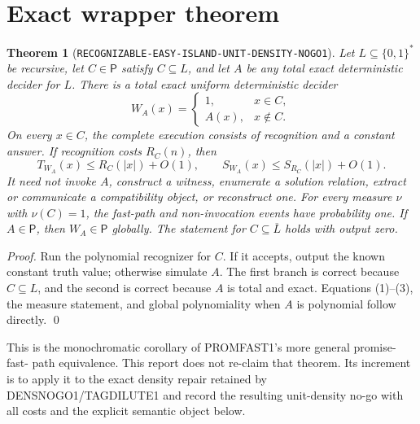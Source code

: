 \documentclass[11pt]{article}
\newtheorem{theorem}{Theorem}
\begin{document}
\section{Exact wrapper theorem}
\begin{theorem}[\texttt{RECOGNIZABLE-EASY-ISLAND-UNIT-DENSITY-NOGO1}]
Let \(L\subseteq\{0,1\}^*\) be recursive, let \(C\in\mathsf P\) satisfy
\(C\subseteq L\), and let \(A\) be any total exact deterministic decider for
\(L\). There is a total exact uniform deterministic decider
\[
 W_A(x)=\begin{cases}1,&x\in C,\\ A(x),&x\notin C.\end{cases} \tag{2}
\]
On every \(x\in C\), the complete execution consists of recognition and a
constant answer. If recognition costs \(R_C(n)\), then
\[
 T_{W_A}(x)\le R_C(|x|)+O(1),\qquad
 S_{W_A}(x)\le S_{R_C}(|x|)+O(1).                        \tag{3}
\]
It need not invoke \(A\), construct a witness, enumerate a solution relation,
extract or communicate a compatibility object, or reconstruct one. For every
measure \(\nu\) with \(\nu(C)=1\), the fast-path and non-invocation events
have probability one. If \(A\in\mathsf P\), then \(W_A\in\mathsf P\)
globally. The statement for \(C\subseteq\overline L\) holds with output zero.
\end{theorem}
\begin{proof}
Run the polynomial recognizer for \(C\). If it accepts, output the known
constant truth value; otherwise simulate \(A\). The first branch is correct
because \(C\subseteq L\), and the second is correct because \(A\) is total and
exact. Equations (1)--(3), the measure statement, and global polynomiality
when \(A\) is polynomial follow directly. \qed
\end{proof}

This is the monochromatic corollary of PROMFAST1's more general promise-fast-
path equivalence. This report does not re-claim that theorem. Its increment is
to apply it to the exact density repair retained by DENSNOGO1/TAGDILUTE1 and
record the resulting unit-density no-go with all costs and the explicit
semantic object below.
\end{document}
